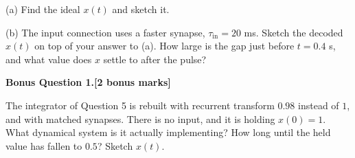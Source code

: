 \documentclass[11pt,letterpaper]{article}
\newcommand{\tin}{\tau_{\mathrm{in}}}
\newcommand{\answerbox}[1]{\par\noindent\framebox[\linewidth]{\rule{0pt}{#1}}\par}
\begin{document}
(a) Find the ideal $x(t)$ and sketch it.
\vspace{1.6cm}
\answerbox{3.4cm}

(b) The input connection uses a faster synapse, $\tin = 20$ ms. Sketch the decoded $x(t)$ on top of your answer to (a). How large is the gap just before $t = 0.4$ s, and what value does $x$ settle to after the pulse?
\answerbox{3.6cm}

\newpage
\textbf{Bonus Question 1.}\hfill\textbf{[2 bonus marks]}\par
The integrator of Question 5 is rebuilt with recurrent transform $0.98$ instead of $1$, and with matched synapses. There is no input, and it is holding $x(0) = 1$. What dynamical system is it actually implementing? How long until the held value has fallen to $0.5$? Sketch $x(t)$.
\vspace{6cm}
\end{document}
